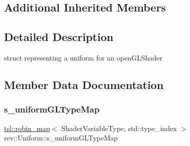 \subsection*{Additional Inherited Members}


\subsection{Detailed Description}
struct representing a uniform for an open\+G\+L\+Shader 

\subsection{Member Data Documentation}
\mbox{\label{structrev_1_1_uniform_a7e15e4113de9b73438bcfd79272f9479}} 
\subsubsection{\texorpdfstring{s\_uniformGLTypeMap}{s\_uniformGLTypeMap}}
{\footnotesize\ttfamily \mbox{\hyperlink{classtsl_1_1robin__map}{tsl\+::robin\+\_\+map}}$<$ Shader\+Variable\+Type, std\+::type\+\_\+index $>$ rev\+::\+Uniform\+::s\+\_\+uniform\+G\+L\+Type\+Map\hspace{0.3cm}{\ttfamily [static]}}

